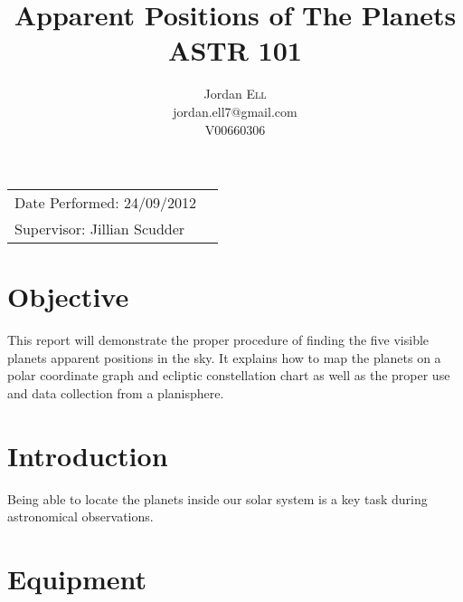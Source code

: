 \documentclass{article}
\title{Apparent Positions of The Planets \\ ASTR 101} %
\author{Jordan \textsc{Ell} \\ jordan.ell7@gmail.com \\ V00660306} %
\begin{document}
\maketitle %

\begin{tabular}{lr}
Date Performed: 24/09/2012 \\ %
Supervisor: Jillian Scudder %
\end{tabular}

\setlength\parindent{0pt} %

\renewcommand{\labelenumi}{\alph{enumi}.} %


\section{Objective}

This report will demonstrate the proper procedure of finding the five visible planets apparent positions in the sky.
It explains how to map the planets on a polar coordinate graph and ecliptic constellation chart as well as the proper 
use and data collection from a planisphere.\\
 

\section{Introduction}

Being able to locate the planets inside our solar system is a key task during astronomical observations. 


\section{Equipment}
\end{document}
